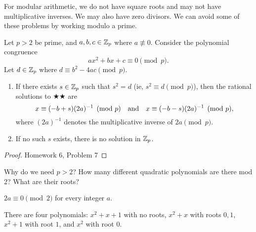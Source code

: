 \documentclass[letterpaper, 11 pt]{article}
\begin{document}
For modular arithmetic, we do not have square roots and may not have multiplicative inverses. We may also have zero divisors. We can avoid some of these problems by working modulo a prime.

\begin{thm}
 Let $p>2$ be prime, and $a,b,c\in\mathbb Z_p$ where $a\not\equiv 0$. Consider the polynomial congruence \[ax^2+bx+c\equiv0\pmod p.\tag{$\bigstar\bigstar$}\] Let $d\in \mathbb Z_p$ where $d\equiv b^2-4ac \pmod p$. 
\begin{enumerate}
 \item If there exists $s\in\mathbb Z_p$ such that $s^2=d$ (ie, $s^2\equiv d\pmod p$), then the rational solutions to $\bigstar\bigstar$ are \[x\equiv(-b+s)(2a)^{-1}\pmod p\quad\textnormal{and}\quad x\equiv(-b-s)(2a)^{-1}\pmod p,\] where $(2a)^{-1}$ denotes the multiplicative inverse of $2a \pmod p$.%
 \item If no such $s$ exists, there is no solution in $\mathbb Z_p$.
\end{enumerate}
\end{thm}
\begin{proof} Homework 6, Problem 7\end{proof}

\begin{br}
 Why do we need $p>2$? How many different quadratic polynomials are there mod 2? What are their roots?
\end{br}
\begin{solution}
$2a\equiv 0 \pmod 2$ for every integer $a$. 

There are four polynomials: $x^2+x+1$ with no roots, $x^2+x$ with roots $0,1$, $x^2+1$ with root $1$, and $x^2$ with root $0$. 
\end{solution}
\end{document}
